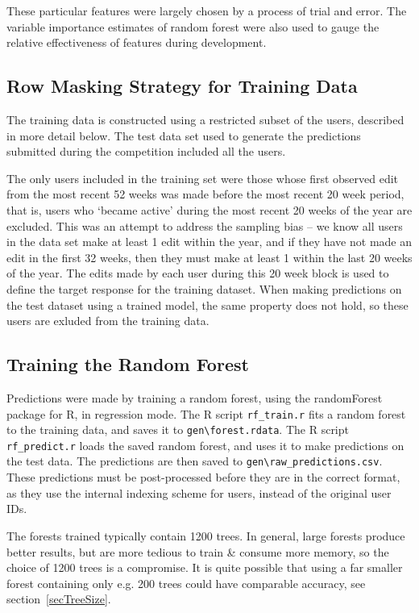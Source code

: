 \documentclass[12pt]{article}
\begin{document}
These particular features were largely chosen by a process of trial and error.
The variable importance estimates of random forest were also used to gauge
the relative effectiveness of features during development.

\subsection{Row Masking Strategy for Training Data}
\label{ssecRowMask}

The training data is constructed using a restricted subset of the users,
described in more detail below. The test data set used to generate
the predictions submitted during the competition included all the users.

The only users included in the training set were those whose first observed
edit from the most recent 52 weeks was made before the most recent 20
week period, that is, users who `became active' during the most recent 20
weeks of the year are excluded. This was an attempt to address the sampling
bias -- we know all users in the data set make at least 1 edit within the year,
and if they have not made an edit in the first 32 weeks, then they must make
at least 1 within the last 20 weeks of the year. The edits made by each user
during this  20 week block is used to define the target response for the
training dataset. When making predictions on the test dataset using a
trained model, the same property does not hold, so these users are
exluded from the training data.

\subsection{Training the Random Forest}

Predictions were made by training a random forest, using
the randomForest package for R, in regression mode.
The R script \verb+rf_train.r+ fits a random forest to the
training data, and saves it to \verb+gen\forest.rdata+. The
R script \verb+rf_predict.r+ loads the saved random forest,
and uses it to make predictions on the test data. The predictions
are then saved to \verb+gen\raw_predictions.csv+. These predictions
must be post-processed before they are in the correct format, as
they use the internal indexing scheme for users, instead of the
original user IDs.

The forests trained typically contain 1200 trees. In general,
large forests produce better results, but are more tedious to
train \& consume more memory, so the choice of 1200 trees is a
compromise. It is quite possible that using a far smaller forest
containing only e.g. 200 trees could have comparable accuracy,
see section~\ref{secTreeSize}.
\end{document}
